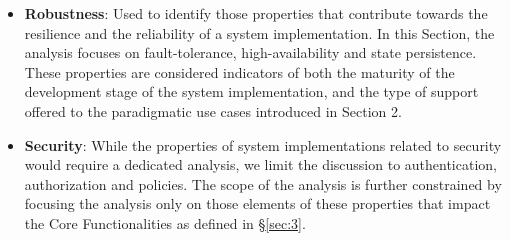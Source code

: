 \documentclass{sig-alternate}
\begin{document}
\begin{itemize}

\item \textbf{Robustness}: Used to identify those properties that
  contribute towards the resilience and the reliability of a \pilot system
  implementation. In this Section, the analysis focuses on
  fault-tolerance, high-availability and state persistence. These
  properties are considered indicators of both the maturity of the
  development stage of the \pilot system implementation, and the type of
  support offered to the paradigmatic use cases introduced in Section
  2.

\item \textbf{Security}: While the properties of \pilot system
  implementations related to security would require a dedicated
  analysis, we limit the discussion to authentication, authorization
  and policies. The scope of the analysis is further constrained by
  focusing the analysis only on those elements of these properties
  that impact the Core Functionalities as defined in
  \S\ref{sec:3}.


\end{itemize}
\end{document}
